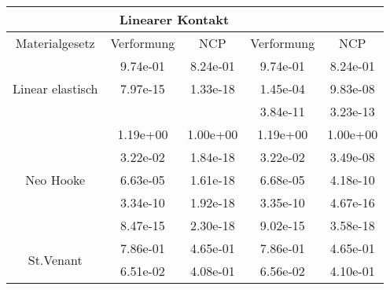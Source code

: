 \begin{table} 
\centering 
\begin{tabular}{c|cc|cc|} 
\cline{2-5} 
 & \multicolumn{2}{|c|}{Linearer Kontakt} &  \\ 
\hline 
\multicolumn{1}{|c|}{Materialgesetz} & \multicolumn{1}{c|}{Verformung} & \multicolumn{1}{c|}{NCP} & \multicolumn{1}{c|}{Verformung} & \multicolumn{1}{c|}{NCP} \\ 
\hline 
\multicolumn{1}{|c|}{\multirow{3}{*}{Linear elastisch}} &\multicolumn{1}{|c|}{  9.74e-01} & \multicolumn{1}{|c|}{  8.24e-01} & \multicolumn{1}{|c|}{  9.74e-01} & \multicolumn{1}{|c|}{  8.24e-01} \\ 
\multicolumn{1}{|c|}{} & \multicolumn{1}{|c|}{  7.97e-15} & \multicolumn{1}{|c|}{  1.33e-18} & \multicolumn{1}{|c|}{  1.45e-04} & \multicolumn{1}{|c|}{  9.83e-08} \\ 
\multicolumn{1}{|c|}{} & \multicolumn{1}{|c|}{} & \multicolumn{1}{|c|}{} & \multicolumn{1}{|c|}{  3.84e-11} & \multicolumn{1}{|c|}{  3.23e-13} \\ 
\hline 
\multicolumn{1}{|c|}{\multirow{5}{*}{Neo Hooke}} &\multicolumn{1}{|c|}{  1.19e+00} & \multicolumn{1}{|c|}{  1.00e+00} & \multicolumn{1}{|c|}{  1.19e+00} & \multicolumn{1}{|c|}{  1.00e+00} \\ 
\multicolumn{1}{|c|}{} & \multicolumn{1}{|c|}{  3.22e-02} & \multicolumn{1}{|c|}{  1.84e-18} & \multicolumn{1}{|c|}{  3.22e-02} & \multicolumn{1}{|c|}{  3.49e-08} \\ 
\multicolumn{1}{|c|}{} & \multicolumn{1}{|c|}{  6.63e-05} & \multicolumn{1}{|c|}{  1.61e-18} & \multicolumn{1}{|c|}{  6.68e-05} & \multicolumn{1}{|c|}{  4.18e-10} \\ 
\multicolumn{1}{|c|}{} & \multicolumn{1}{|c|}{  3.34e-10} & \multicolumn{1}{|c|}{  1.92e-18} & \multicolumn{1}{|c|}{  3.35e-10} & \multicolumn{1}{|c|}{  4.67e-16} \\ 
\multicolumn{1}{|c|}{} & \multicolumn{1}{|c|}{  8.47e-15} & \multicolumn{1}{|c|}{  2.30e-18} & \multicolumn{1}{|c|}{  9.02e-15} & \multicolumn{1}{|c|}{  3.58e-18} \\ 
\hline 
\multicolumn{1}{|c|}{\multirow{5}{*}{St.Venant}} &\multicolumn{1}{|c|}{  7.86e-01} & \multicolumn{1}{|c|}{  4.65e-01} & \multicolumn{1}{|c|}{  7.86e-01} & \multicolumn{1}{|c|}{  4.65e-01} \\ 
\multicolumn{1}{|c|}{} & \multicolumn{1}{|c|}{  6.51e-02} & \multicolumn{1}{|c|}{  4.08e-01} & \multicolumn{1}{|c|}{  6.56e-02} & \multicolumn{1}{|c|}{  4.10e-01} \\ 

\end{tabular}
\end{table}
